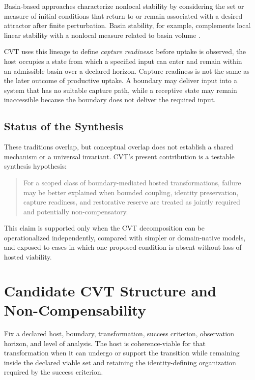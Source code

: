 Basin-based approaches characterize nonlocal stability by considering the set or measure of initial conditions that return to or remain associated with a desired attractor after finite perturbation. Basin stability, for example, complements local linear stability with a nonlocal measure related to basin volume \cite{menck2013}.

CVT uses this lineage to define \emph{capture readiness}: before uptake is observed, the host occupies a state from which a specified input can enter and remain within an admissible basin over a declared horizon. Capture readiness is not the same as the later outcome of productive uptake. A boundary may deliver input into a system that has no suitable capture path, while a receptive state may remain inaccessible because the boundary does not deliver the required input.

\subsection{Status of the Synthesis}

These traditions overlap, but conceptual overlap does not establish a shared mechanism or a universal invariant. CVT's present contribution is a testable synthesis hypothesis:

\begin{quote}
For a scoped class of boundary-mediated hosted transformations, failure may be better explained when bounded coupling, identity preservation, capture readiness, and restorative reserve are treated as jointly required and potentially non-compensatory.
\end{quote}

This claim is supported only when the CVT decomposition can be operationalized independently, compared with simpler or domain-native models, and exposed to cases in which one proposed condition is absent without loss of hosted viability.

\section{Candidate CVT Structure and Non-Compensability}
\label{sec:invariant}

\begin{definition}
Fix a declared host, boundary, transformation, success criterion, observation horizon, and level of analysis. The host is coherence-viable for that transformation when it can undergo or support the transition while remaining inside the declared viable set and retaining the identity-defining organization required by the success criterion.
\end{definition}


